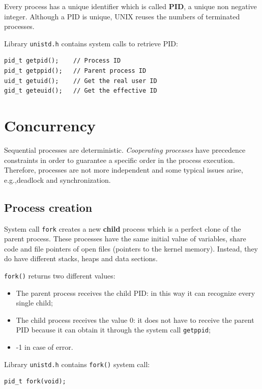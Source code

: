 Every process has a unique identifier which is called \textbf{PID}, a unique non negative integer. Although a PID is unique, UNIX reuses the numbers of terminated processes.

Library \texttt{unistd.h} contains system calls to retrieve PID:
\begin{verbatim}
pid_t getpid();    // Process ID
pid_t getppid();   // Parent process ID
uid_t getuid();    // Get the real user ID
gid_t geteuid();   // Get the effective ID
\end{verbatim}
\section{Concurrency}
Sequential processes are deterministic. \textit{Cooperating processes} have precedence constraints in order to guarantee a specific order in the process execution. Therefore, processes are not more independent and some typical issues arise, e.g.,\@ deadlock and synchronization.

\subsection{Process creation}
System call \texttt{fork} creates a new \textbf{child} process which is a perfect clone of the parent process. These processes have the same initial value of variables, share code and file pointers of open files (pointers to the kernel memory). Instead, they do have different stacks, heaps and data sections.

\texttt{fork()} returns two different values:
\begin{itemize}
\item The parent process receives the child PID: in this way it can recognize every single child;
\item The child process receives the value 0: it does not have to receive the parent PID because it can obtain it through the system call \texttt{getppid};
\item -1 in case of error.
\end{itemize}

Library \texttt{unistd.h} contains \texttt{fork()} system call:
\begin{verbatim}
pid_t fork(void);
\end{verbatim}

